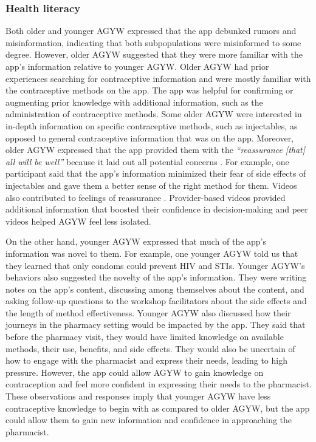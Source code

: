 \subsubsection{Health literacy}

Both older and younger AGYW expressed that the app debunked rumors and misinformation, indicating that both subpopulations were misinformed to some degree. However, older AGYW suggested that they were more familiar with the app’s information relative to younger AGYW. Older AGYW had prior experiences searching for contraceptive information and were mostly familiar with the contraceptive methods on the app. The app was helpful for confirming or augmenting prior knowledge with additional information, such as the administration of contraceptive methods. Some older AGYW were interested in  in-depth information on specific contraceptive methods, such as injectables, as opposed to general contraceptive information that was on the app. Moreover, older AGYW expressed that the app provided them with the \textit{``reassurance [that] all will be well”} because it laid out all potential concerns . For example, one participant said that the app’s information minimized their fear of side effects of injectables and gave them a better sense of the right method for them. Videos also contributed to feelings of reassurance . Provider-based videos provided additional information that boosted their confidence in decision-making and peer videos helped AGYW feel less isolated. 

On the other hand, younger AGYW expressed that much of the app’s information was novel to them. For example, one younger AGYW told us that they learned that only condoms could prevent HIV and STIs. Younger AGYW’s behaviors also suggested the novelty of the app’s information. They were writing notes on the app’s content, discussing among themselves about the content, and asking follow-up questions to the workshop facilitators about the side effects and the length of method effectiveness. Younger AGYW also discussed how their journeys in the pharmacy setting would be impacted by the app. They said that before the pharmacy visit, they would have limited knowledge on available methods, their use, benefits, and side effects. They would also be uncertain of how to engage with the pharmacist and express their needs, leading to high pressure. However, the app could allow AGYW to gain knowledge on contraception and feel more confident in expressing their needs to the pharmacist. These observations and responses imply that younger AGYW have less contraceptive knowledge to begin with as compared to older AGYW, but the app could allow them to gain new information and confidence in approaching the pharmacist.

